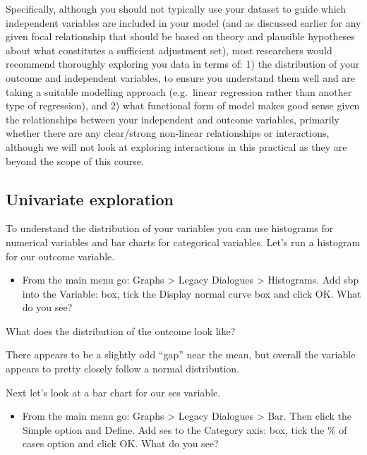 \documentclass[
]{book}
\providecommand{\tightlist}{%
  \setlength{\itemsep}{0pt}\setlength{\parskip}{0pt}}
\begin{document}
Specifically, although you should not typically use your dataset to guide which independent variables are included in your model (and as discussed earlier for any given focal relationship that should be based on theory and plausible hypotheses about what constitutes a sufficient adjustment set), most researchers would recommend thoroughly exploring you data in terms of: 1) the distribution of your outcome and independent variables, to ensure you understand them well and are taking a suitable modelling approach (e.g.~linear regression rather than another type of regression), and 2) what functional form of model makes good sense given the relationships between your independent and outcome variables, primarily whether there are any clear/strong non-linear relationships or interactions, although we will not look at exploring interactions in this practical as they are beyond the scope of this course.

\hypertarget{univariate-exploration}{%
\subsection{Univariate exploration}\label{univariate-exploration}}

To understand the distribution of your variables you can use histograms for numerical variables and bar charts for categorical variables. Let's run a histogram for our outcome variable.

\begin{itemize}
\tightlist
\item
  From the main menu go: Graphs \textgreater{} Legacy Dialogues \textgreater{} Histograms. Add sbp into the Variable: box, tick the Display normal curve box and click OK. What do you see?
\end{itemize}

What does the distribution of the outcome look like?

There appears to be a slightly odd ``gap'' near the mean, but overall the variable appears to pretty closely follow a normal distribution.

Next let's look at a bar chart for our ses variable.

\begin{itemize}
\tightlist
\item
  From the main menu go: Graphs \textgreater{} Legacy Dialogues \textgreater{} Bar. Then click the Simple option and Define. Add ses to the Category axis: box, tick the \% of cases option and click OK. What do you see?
\end{itemize}
\end{document}
